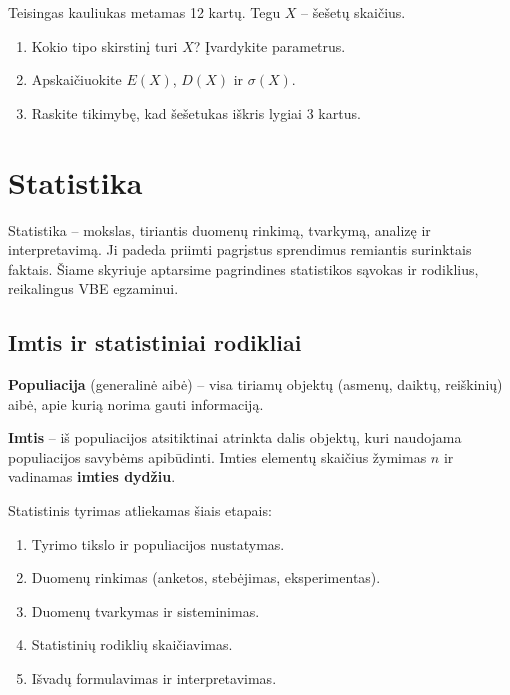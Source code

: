\begin{exercise}
Teisingas kauliukas metamas 12 kartų. Tegu $X$ – šešetų skaičius.
\begin{enumerate}[label=\alph*)]
  \item Kokio tipo skirstinį turi $X$? Įvardykite parametrus.
  \item Apskaičiuokite $E(X)$, $D(X)$ ir $\sigma(X)$.
  \item Raskite tikimybę, kad šešetukas iškris lygiai 3 kartus.
\end{enumerate}
\end{exercise}

\section{Statistika}

Statistika – mokslas, tiriantis duomenų rinkimą, tvarkymą, analizę ir interpretavimą.
Ji padeda priimti pagrįstus sprendimus remiantis surinktais faktais. Šiame skyriuje
aptarsime pagrindines statistikos sąvokas ir rodiklius, reikalingus VBE egzaminui.

\subsection{Imtis ir statistiniai rodikliai}

\begin{definition}[Populiacija]
\textbf{Populiacija} (generalinė aibė) – visa tiriamų objektų (asmenų, daiktų,
reiškinių) aibė, apie kurią norima gauti informaciją.
\end{definition}

\begin{definition}[Imtis]
\textbf{Imtis} – iš populiacijos atsitiktinai atrinkta dalis objektų, kuri
naudojama populiacijos savybėms apibūdinti. Imties elementų skaičius žymimas $n$
ir vadinamas \textbf{imties dydžiu}.
\end{definition}

Statistinis tyrimas atliekamas šiais etapais:
\begin{enumerate}
  \item Tyrimo tikslo ir populiacijos nustatymas.
  \item Duomenų rinkimas (anketos, stebėjimas, eksperimentas).
  \item Duomenų tvarkymas ir sisteminimas.
  \item Statistinių rodiklių skaičiavimas.
  \item Išvadų formulavimas ir interpretavimas.
\end{enumerate}


